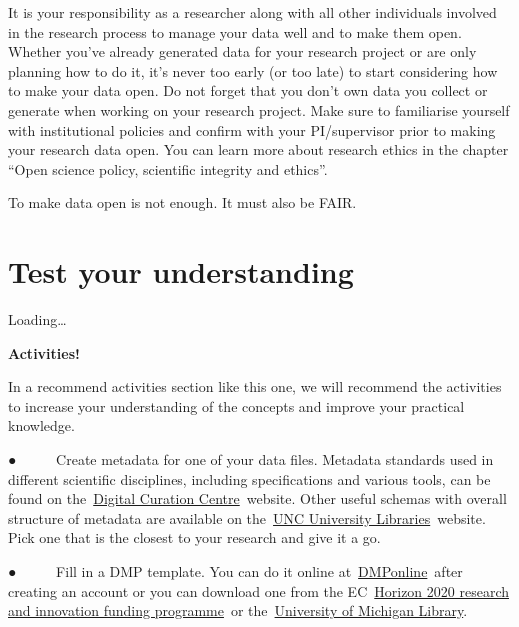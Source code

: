 \documentclass[
]{book}
\begin{document}
It is your responsibility as a researcher along with all other individuals involved in the research process to manage your data well and to make them open. Whether you've already generated data for your research project or are only planning how to do it, it's never too early (or too late) to start considering how to make your data open. Do not forget that you don't own data you collect or generate when working on your research project. Make sure to familiarise yourself with institutional policies and confirm with your PI/supervisor prior to making your research data open. You can learn more about research ethics in the chapter ``Open science policy, scientific integrity and ethics''.

To make data open is not enough. It must also be FAIR.

\hypertarget{test-your-understanding-4}{%
\section{Test your understanding}\label{test-your-understanding-4}}

Loading\ldots{}

\textbf{Activities!}

In a recommend activities section like this one, we will recommend the activities to increase your understanding of the concepts and improve your practical knowledge.

● ~ ~ ~ Create metadata for one of your data files. Metadata standards used in different scientific disciplines, including specifications and various tools, can be found on the~\href{https://www.dcc.ac.uk/guidance/standards/metadata}{}\href{https://www.dcc.ac.uk/guidance/standards/metadata}{Digital Curation Centre}~website. Other useful schemas with overall structure of metadata are available on the~\href{https://guides.lib.unc.edu/metadata/standards}{}\href{https://guides.lib.unc.edu/metadata/standards}{UNC University Libraries}~website. Pick one that is the closest to your research and give it a go.

● ~ ~ ~ Fill in a DMP template. You can do it online at~\href{https://dmponline.dcc.ac.uk/}{}\href{https://dmponline.dcc.ac.uk/}{DMPonline}~after creating an account or you can download one from the EC~\href{https://ec.europa.eu/research/participants/data/ref/h2020/gm/reporting/h2020-tpl-oa-data-mgt-plan_en.docx}{}\href{https://ec.europa.eu/research/participants/data/ref/h2020/gm/reporting/h2020-tpl-oa-data-mgt-plan_en.docx}{Horizon 2020 research and innovation funding programme}~or the~\href{https://guides.lib.umich.edu/c.php?g=283277\&p=2138498}{}\href{https://guides.lib.umich.edu/c.php?g=283277\&p=2138498}{University of Michigan Library}.
\end{document}
